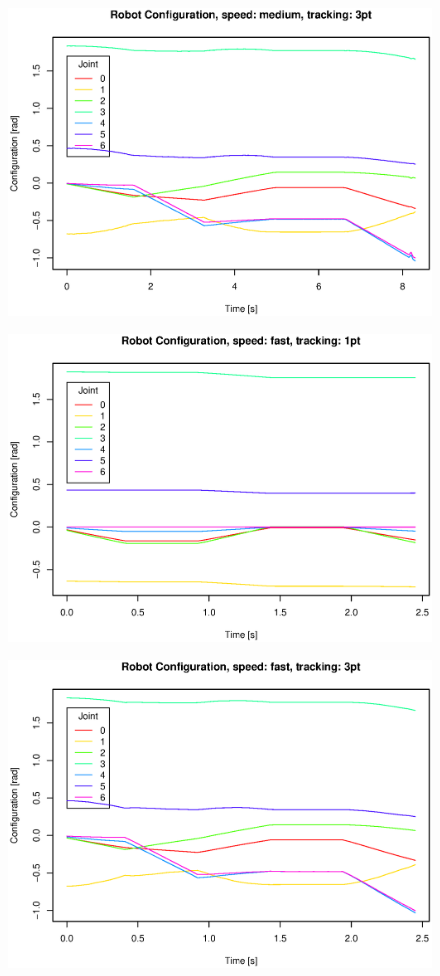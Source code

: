 \begin{figure}[H]
\centering
\includegraphics[width= \linewidth]{graphics/robotics/robotConfiguration_medium_3pt}
\caption{}
\label{fig:}
\end{figure}

\begin{figure}[H]
\centering
\includegraphics[width= \linewidth]{graphics/robotics/robotConfiguration_fast_1pt}
\caption{}
\label{fig:}
\end{figure}

\begin{figure}[H]
\centering
\includegraphics[width= \linewidth]{graphics/robotics/robotConfiguration_fast_3pt}
\caption{}
\label{fig:}
\end{figure}


